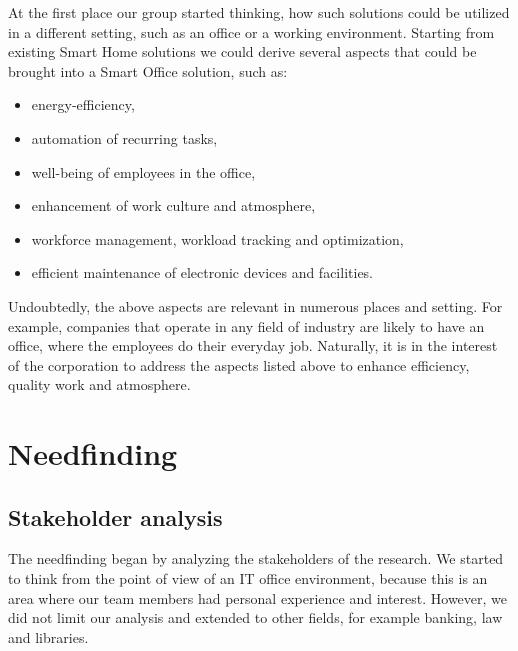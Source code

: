 \documentclass[english]{tktltiki}
\begin{document}
At the first place our group started thinking, how such solutions could be utilized in a different setting, such as an office or a working environment. Starting from existing Smart Home solutions we could derive several aspects that could be brought into a Smart Office solution, such as: 

\begin{itemize}
	\item energy-efficiency, 
	\item automation of recurring tasks,
	\item well-being of employees in the office,
	\item enhancement of work culture and atmosphere, 
	\item workforce management, workload tracking and optimization,
	\item efficient maintenance of electronic devices and facilities.
\end{itemize}

Undoubtedly, the above aspects are relevant in numerous places and setting. For example, companies that operate in any field of industry are likely to have an office, where the employees do their everyday job. Naturally, it is in the interest of the corporation to address the aspects listed above to enhance efficiency, quality work and atmosphere. 

\section{Needfinding}
\subsection{Stakeholder analysis}
The needfinding began by analyzing the stakeholders of the research. We started to think from the point of view of an IT office environment, because this is an area where our team members had personal experience and interest. However, we did not limit our analysis and extended to other fields, for example banking, law and libraries. 
\end{document}
